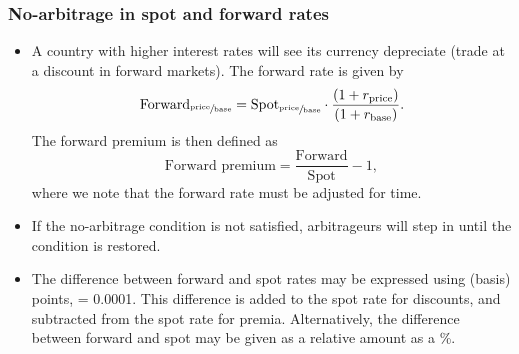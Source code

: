 \documentclass[../notes_compiled.tex]{subfiles}
\begin{document}
\subsubsection{No-arbitrage in spot and forward rates}
\label{sec-no-arbitrage-forward}
\begin{itemize}
\item A country with higher interest rates will see its currency depreciate (trade at a discount in forward markets). The forward  rate is given by
\begin{equation}
\text{Forward}_{\sfrac{\text{price}}{\text{base}}} = \text{Spot}_{\sfrac{\text{price}}{\text{base}}} \cdot \frac{\left(1+r_{\text{price}}\right)}{\left(1+r_{\text{base}}\right)}. \label{forward-exchange-rates}
\end{equation}
The forward premium is then defined as
\begin{equation}
\text{Forward premium} = \frac{\text{Forward}}{\text{Spot}}-1,
\end{equation}
where we note that the forward rate must be adjusted for time.
\item If the no-arbitrage condition is not satisfied, arbitrageurs will step in until the condition is restored.
\item The difference between forward and spot rates may be expressed using (basis) points, = 0.0001. This difference is added to the spot rate for discounts, and subtracted from the spot rate for premia. Alternatively, the difference between forward and spot may be given as a relative amount as a \%.
\end{itemize}
\end{document}
